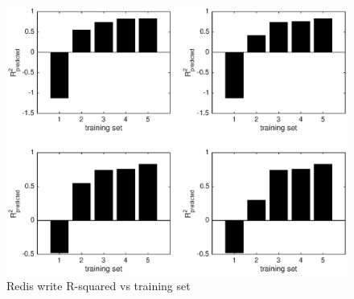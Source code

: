 \documentclass{acm_proc_article-sp}
\begin{document}
  \begin{figure}
    \centering
    \includegraphics[scale = 0.5]{bar_write_avg_latency.eps}
    \caption{Redis write R-squared vs training set}
    \label{figure:redisbarread}
  \end{figure}
\end{document}
